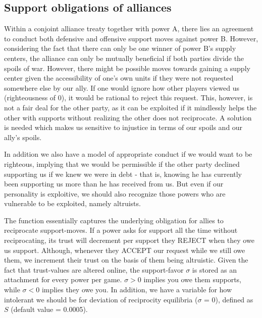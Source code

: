 \documentclass[a4paper]{article} %
\begin{document}
\subsection{Support obligations of alliances}

Within a conjoint alliance treaty together with power A, there lies an agreement to conduct both defensive and offensive support moves against power B. However, considering the fact that there can only be one winner of power B’s supply centers, the alliance can only be mutually beneficial if both parties divide the spoils of war. However, there might be possible moves towards gaining a supply center given the accessibility of one's own units if they were not requested somewhere else by our ally. If one would ignore how other players viewed us (righteousness of 0), it would be rational to reject this request. This, however, is not a fair deal for the other party, as it can be exploited if it mindlessly helps the other with supports without realizing the other does not reciprocate. A solution is needed which makes us sensitive to injustice in terms of our spoils and our ally's spoils.

 In addition we also have a model of appropriate conduct if we would want to be righteous, implying that we would be permissible if the other party declined supporting us if we knew we were in debt - that is, knowing he has currently been supporting us more than he has received from us. But even if our personality is exploitive, we should also recognize those powers who are vulnerable to be exploited, namely altruists.

The function essentially captures the underlying obligation for allies to reciprocate support-moves. If a power asks for support all the time without reciprocating, its trust will decrement per support they REJECT when they owe us support. Although, whenever they  ACCEPT our request while we still owe them, we increment their trust on the basis of them being altruistic. Given the fact that trust-values are altered online, the support-favor $\sigma$ is stored as an attachment for every power per game. $\sigma > 0 $ implies you owe them supports, while $\sigma < 0$ implies they owe you. In addition, we have a variable for how intolerant we should be for deviation of reciprocity equilibria ($\sigma$ = 0), defined as $S$ (default value = 0.0005).\\
\end{document}
